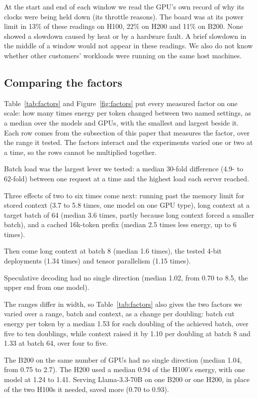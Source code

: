 \documentclass[11pt]{article}
\begin{document}
At the start and end of each window we read the GPU's own record of why its clocks were being held down (its throttle reasons). The board was at its power limit in 13\% of these readings on H100, 22\% on H200 and 11\% on B200. None showed a slowdown caused by heat or by a hardware fault. A brief slowdown in the middle of a window would not appear in these readings. We also do not know whether other customers' workloads were running on the same host machines.

\subsection{Comparing the factors}\label{sec:factors}

Table~\ref{tab:factors} and Figure~\ref{fig:factors} put every measured factor on one scale: how many times energy per token changed between two named settings, as a median over the models and GPUs, with the smallest and largest beside it. Each row comes from the subsection of this paper that measures the factor, over the range it tested. The factors interact and the experiments varied one or two at a time, so the rows cannot be multiplied together.

Batch load was the largest lever we tested: a median 30-fold difference (4.9- to 62-fold) between one request at a time and the highest load each server reached.

Three effects of two to six times come next: running past the memory limit for stored context (3.7 to 5.8 times, one model on one GPU type), long context at a target batch of 64 (median 3.6 times, partly because long context forced a smaller batch), and a cached 16k-token prefix (median 2.5 times less energy, up to 6 times).

Then come long context at batch 8 (median 1.6 times), the tested 4-bit deployments (1.34 times) and tensor parallelism (1.15 times).

Speculative decoding had no single direction (median 1.02, from 0.70 to 8.5, the upper end from one model).

The ranges differ in width, so Table~\ref{tab:factors} also gives the two factors we varied over a range, batch and context, as a change per doubling: batch cut energy per token by a median 1.53 for each doubling of the achieved batch, over five to ten doublings, while context raised it by 1.10 per doubling at batch 8 and 1.33 at batch 64, over four to five.

The B200 on the same number of GPUs had no single direction (median 1.04, from 0.75 to 2.7). The H200 used a median 0.94 of the H100's energy, with one model at 1.24 to 1.41. Serving Llama-3.3-70B on one B200 or one H200, in place of the two H100s it needed, saved more (0.70 to 0.93).
\end{document}

